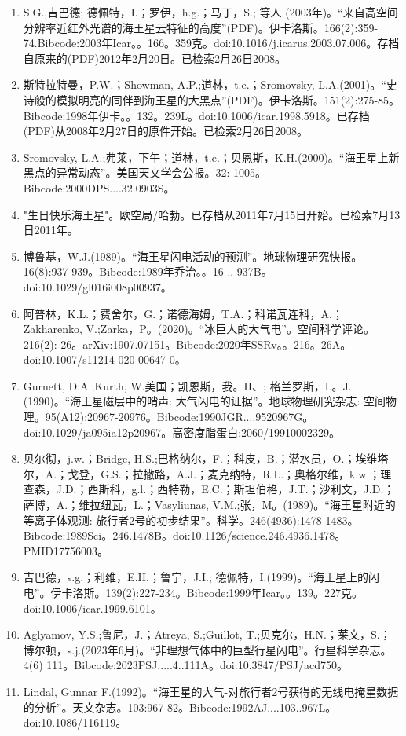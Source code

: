 \begin{enumerate}
\item S.G.,吉巴德; 德佩特，I.；罗伊，h.g.；马丁，S.; 等人 (2003年)。“来自高空间分辨率近红外光谱的海王星云特征的高度”(PDF)。伊卡洛斯。166(2):359-74.Bibcode:2003年Icar。。166。359克。doi:10.1016/j.icarus.2003.07.006。存档自原来的(PDF)2012年2月20日。已检索2月26日2008。
\item 斯特拉特曼，P.W.；Showman, A.P.;道林，t.e.；Sromovsky, L.A.(2001)。“史诗般的模拟明亮的同伴到海王星的大黑点”(PDF)。伊卡洛斯。151(2):275-85。Bibcode:1998年伊卡。。132。239L。doi:10.1006/icar.1998.5918。已存档(PDF)从2008年2月27日的原件开始。已检索2月26日2008。
\item Sromovsky, L.A.;弗莱，下午；道林，t.e.；贝恩斯，K.H.(2000)。“海王星上新黑点的异常动态”。美国天文学会公报。32: 1005。Bibcode:2000DPS....32.0903S。
\item "生日快乐海王星"。欧空局/哈勃。已存档从2011年7月15日开始。已检索7月13日2011年。
\item 博鲁基，W.J.(1989)。“海王星闪电活动的预测”。地球物理研究快报。16(8):937-939。Bibcode:1989年乔治。。16 .. 937B。doi:10.1029/gl016i008p00937。
\item 阿普林，K.L.；费舍尔，G.；诺德海姆，T.A.；科诺瓦连科，A.；Zakharenko, V.;Zarka，P。(2020)。“冰巨人的大气电”。空间科学评论。216(2): 26。arXiv:1907.07151。Bibcode:2020年SSRv。。216。26A。doi:10.1007/s11214-020-00647-0。
\item Gurnett, D.A.;Kurth, W.美国；凯恩斯，我。H、; 格兰罗斯，L。J.(1990)。“海王星磁层中的哨声: 大气闪电的证据”。地球物理研究杂志: 空间物理。95(A12):20967-20976。Bibcode:1990JGR....9520967G。doi:10.1029/ja095ia12p20967。高密度脂蛋白:2060/19910002329。
\item 贝尔彻，j.w.；Bridge, H.S.;巴格纳尔，F.；科皮，B.；潜水员，O.；埃维塔尔，A.；戈登，G.S.；拉撒路，A.J.；麦克纳特，R.L.；奥格尔维，k.w.；理查森，J.D.；西斯科，g.l.；西特勒，E.C.；斯坦伯格，J.T.；沙利文，J.D.；萨博，A.；维拉纽瓦，L.；Vasyliunas, V.M.;张，M。(1989)。“海王星附近的等离子体观测: 旅行者2号的初步结果”。科学。246(4936):1478-1483。Bibcode:1989Sci。246.1478B。doi:10.1126/science.246.4936.1478。PMID17756003。 
\item 吉巴德，s.g.；利维，E.H.；鲁宁，J.I.; 德佩特，I.(1999)。“海王星上的闪电”。伊卡洛斯。139(2):227-234。Bibcode:1999年Icar。。139。227克。doi:10.1006/icar.1999.6101。
\item Aglyamov, Y.S.;鲁尼，J.；Atreya, S.;Guillot, T.;贝克尔，H.N.；莱文，S.；博尔顿，s.j.(2023年6月)。“非理想气体中的巨型行星闪电”。行星科学杂志。4(6) 111。Bibcode:2023PSJ.....4..111A。doi:10.3847/PSJ/acd750。
\item Lindal, Gunnar F.(1992)。“海王星的大气-对旅行者2号获得的无线电掩星数据的分析”。天文杂志。103:967-82。Bibcode:1992AJ....103..967L。doi:10.1086/116119。

\end{enumerate}
